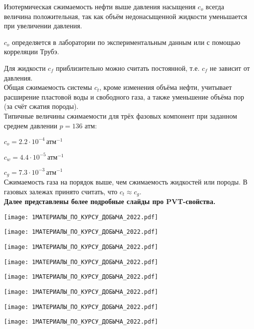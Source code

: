 Изотермическая сжимаемость нефти выше давления насыщения $c_o$ всегда величина положительная, так как объём недонасыщенной жидкости уменьшается при увеличении давления.

$c_o$ определяется в лаборатории по экспериментальным данным или с помощью корреляции Трубэ.

Для жидкости $c_f$ приблизительно можно считать постоянной, т.е. $c_f$ не зависит от давления.
\\

Общая сжимаемость системы $c_t$, кроме изменения объёма нефти, учитывает расширение пластовой воды и свободного газа, а также уменьшение объёма пор (за счёт сжатия породы).
\\

Типичные величины сжимаемости для трёх фазовых компонент при заданном среднем давлении $p=136\text{ атм}$:

$c_o=2.2\cdot 10^{-4} \, \text{атм}^{-1}$

$c_w=4.4\cdot 10^{-5} \, \text{атм}^{-1}$

$c_g=7.3\cdot 10^{-3} \, \text{атм}^{-1}$
\\

Сжимаемость газа на порядок выше, чем сжимаемость жидкостей или породы.
В газовых залежах принято считать, что $c_t\approx c_g$.
\\

\textbf{Далее представлены более подробные слайды про PVT-свойства.}

\texttt{[image: 1МАТЕРИАЛЫ\_ПО\_КУРСУ\_ДОБЫЧА\_2022.pdf]}

\texttt{[image: 1МАТЕРИАЛЫ\_ПО\_КУРСУ\_ДОБЫЧА\_2022.pdf]}

\texttt{[image: 1МАТЕРИАЛЫ\_ПО\_КУРСУ\_ДОБЫЧА\_2022.pdf]}

\texttt{[image: 1МАТЕРИАЛЫ\_ПО\_КУРСУ\_ДОБЫЧА\_2022.pdf]}

\texttt{[image: 1МАТЕРИАЛЫ\_ПО\_КУРСУ\_ДОБЫЧА\_2022.pdf]}

\texttt{[image: 1МАТЕРИАЛЫ\_ПО\_КУРСУ\_ДОБЫЧА\_2022.pdf]}

\texttt{[image: 1МАТЕРИАЛЫ\_ПО\_КУРСУ\_ДОБЫЧА\_2022.pdf]}

\texttt{[image: 1МАТЕРИАЛЫ\_ПО\_КУРСУ\_ДОБЫЧА\_2022.pdf]}

